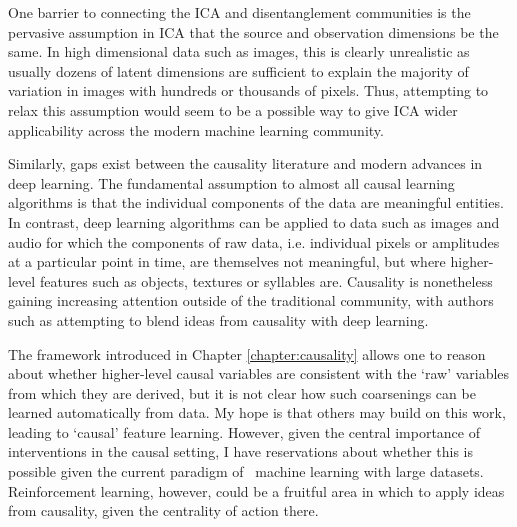 One barrier to connecting the ICA and disentanglement communities is the pervasive assumption in ICA that the source and observation dimensions be the same.
In high dimensional data such as images, this is clearly unrealistic as usually dozens of latent dimensions are sufficient to explain the majority of variation in images with hundreds or thousands of pixels. 
Thus, attempting to relax this assumption would seem to be a possible way to give ICA wider applicability across the modern machine learning community.


Similarly, gaps exist between the causality literature and modern advances in deep learning.
The fundamental assumption to almost all causal learning algorithms is that the individual components of the data are meaningful entities. 
In contrast, deep learning algorithms can be applied to data such as images and audio for which the components of raw data, i.e. individual pixels or amplitudes at a particular point in time, are themselves not meaningful, but where higher-level features such as objects, textures or syllables are.
Causality is nonetheless gaining increasing attention outside of the traditional community, with authors such as \cite{bengio2019meta} attempting to blend ideas from causality with deep learning.

The framework introduced in Chapter \ref{chapter:causality} allows one to reason about whether higher-level causal variables are consistent with the `raw' variables from which they are derived, but it is not clear how such coarsenings can be learned automatically from data.
My hope is that others may build on this work, leading to `causal' feature learning.
However, given the central importance of interventions in the causal setting, I have reservations about whether this is possible given the current paradigm of \iid~machine learning with large datasets.
Reinforcement learning, however, could be a fruitful area in which to apply ideas from causality, given the centrality of action there.




